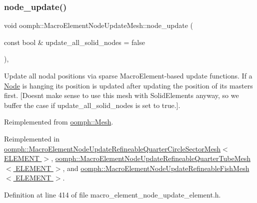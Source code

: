 \mbox{\label{classoomph_1_1MacroElementNodeUpdateMesh_ab5271c4514bcd236271307361423ac9d}} 
\subsubsection{\texorpdfstring{node\+\_\+update()}{node\_update()}}
{\footnotesize\ttfamily void oomph\+::\+Macro\+Element\+Node\+Update\+Mesh\+::node\+\_\+update (\begin{DoxyParamCaption}\item[{const bool \&}]{update\+\_\+all\+\_\+solid\+\_\+nodes = {\ttfamily false} }\end{DoxyParamCaption})\hspace{0.3cm}{\ttfamily [inline]}, {\ttfamily [virtual]}}



Update all nodal positions via sparse Macro\+Element-\/based update functions. If a \hyperlink{classoomph_1_1Node}{Node} is hanging its position is updated after updating the position of its masters first. \mbox{[}Doesn\textquotesingle{}t make sense to use this mesh with Solid\+Elements anyway, so we buffer the case if update\+\_\+all\+\_\+solid\+\_\+nodes is set to true.\mbox{]}. 



Reimplemented from \hyperlink{classoomph_1_1Mesh_a95bf112e5e1b3892e70a41f91b3cc523}{oomph\+::\+Mesh}.



Reimplemented in \hyperlink{classoomph_1_1MacroElementNodeUpdateRefineableQuarterCircleSectorMesh_a99403c711c3fdc2a601b478deebef9fe}{oomph\+::\+Macro\+Element\+Node\+Update\+Refineable\+Quarter\+Circle\+Sector\+Mesh$<$ E\+L\+E\+M\+E\+N\+T $>$}, \hyperlink{classoomph_1_1MacroElementNodeUpdateRefineableQuarterTubeMesh_a6255c22765a484ac11642ade0c084082}{oomph\+::\+Macro\+Element\+Node\+Update\+Refineable\+Quarter\+Tube\+Mesh$<$ E\+L\+E\+M\+E\+N\+T $>$}, and \hyperlink{classoomph_1_1MacroElementNodeUpdateRefineableFishMesh_a1008dd9faa50699dcef68c8c35d6979c}{oomph\+::\+Macro\+Element\+Node\+Update\+Refineable\+Fish\+Mesh$<$ E\+L\+E\+M\+E\+N\+T $>$}.



Definition at line 414 of file macro\+\_\+element\+\_\+node\+\_\+update\+\_\+element.\+h.



